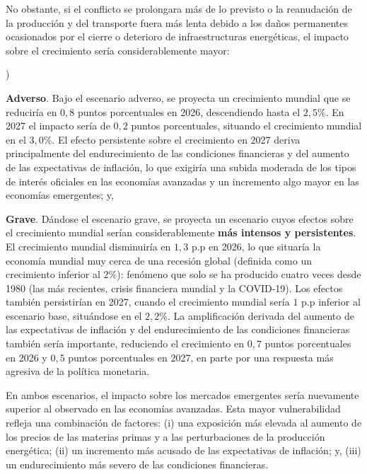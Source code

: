 \documentclass[10pt,a4paper]{article}
\newcounter{alphaitem}
\newenvironment{la}
      {\begin{list}{\alph{alphaitem})}{%
          \usecounter{alphaitem}%
          \setlength{\leftmargin}{1cm}%
          \setlength{\parskip}{3pt}%
          \setlength{\itemsep}{0pt}%
          \setlength{\parsep}{0pt}%
      }}
      {\end{list}}
\begin{document}
No obstante, si el conflicto se prolongara más de lo previsto o la reanudación de la producción y del transporte fuera más lenta debido a los daños permanentes ocasionados por el cierre o deterioro de infraestructuras energéticas, el impacto sobre el crecimiento sería considerablemente mayor:
\begin{la}
    \item \textbf{Adverso}. Bajo el escenario adverso, se proyecta un crecimiento mundial que se reduciría en $0,8$ puntos porcentuales en 2026, descendiendo hasta el $2,5\%$. En 2027 el impacto sería de $0,2$ puntos porcentuales, situando el crecimiento mundial en el $3,0\%$. El efecto persistente sobre el crecimiento en 2027 deriva principalmente del endurecimiento de las condiciones financieras y del aumento de las expectativas de inflación, lo que exigiría una subida moderada de los tipos de interés oficiales en las economías avanzadas y un incremento algo mayor en las economías emergentes; y,
    \item \textbf{Grave}. Dándose el escenario grave, se proyecta un escenario cuyos efectos sobre el crecimiento mundial serían considerablemente \textbf{más intensos y persistentes}. El crecimiento mundial disminuiría en $1,3$ p.p en 2026, lo que situaría la economía mundial muy cerca de una recesión global (definida como un crecimiento inferior al $2\%$): fenómeno que solo se ha producido cuatro veces desde 1980 (las más recientes, crisis financiera mundial y la COVID-19). Los efectos también persistirían en 2027, cuando el crecimiento mundial sería $1$ p.p inferior al escenario base, situándose en el $2,2\%$. La amplificación derivada del aumento de las expectativas de inflación y del endurecimiento de las condiciones financieras también sería importante, reduciendo el crecimiento en $0,7$ puntos porcentuales en 2026 y $0,5$ puntos porcentuales en 2027, en parte por una respuesta más agresiva de la política monetaria.
\end{la}

En ambos escenarios, el impacto sobre los mercados emergentes sería nuevamente superior al observado en las economías avanzadas. Esta mayor vulnerabilidad refleja una combinación de factores: (i) una exposición más elevada al aumento de los precios de las materias primas y a las perturbaciones de la producción energética; (ii) un incremento más acusado de las expectativas de inflación; y, (iii) un endurecimiento más severo de las condiciones financieras.
\end{document}
